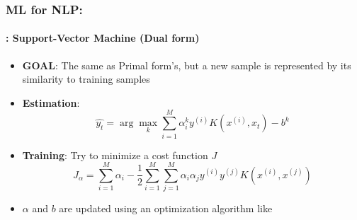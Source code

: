 \documentclass[xcolor=table]{beamer}
\begin{document}
	\begin{frame}
		\frametitle{ML for NLP: \insertsection}
		\framesubtitle{\insertsubsection: Support-Vector Machine (Dual form)}
		
		\begin{minipage}{0.75\textwidth} 
			\begin{itemize}
				\item \textbf{GOAL}: The same as Primal form's, but a new sample is represented by its similarity to training samples
				\item \textbf{Estimation}: 
				\[\hat{y_t} = \arg\max_{k} \sum^M_{i=1} \alpha^k_i y^{(i)} K(x^{(i)}, x_t) - b^k\]
			\end{itemize}
		\end{minipage}
		\begin{minipage}{0.24\textwidth} 
		\end{minipage}
	
	
		\begin{itemize}
			\item \textbf{Training}: Try to minimize a cost function $ J $
			\[J_\alpha = \sum\limits_{i=1}^{M} \alpha_i - \frac{1}{2} \sum\limits_{i=1}^{M} \sum\limits_{j=1}^{M} \alpha_i \alpha_j y^{(i)} y^{(j)} K(x^{(i)}, x^{(j)})\]
			\item $\alpha$ and $ b $ are updated using an optimization algorithm like 
		\end{itemize}
		
	\end{frame}
\end{document}
